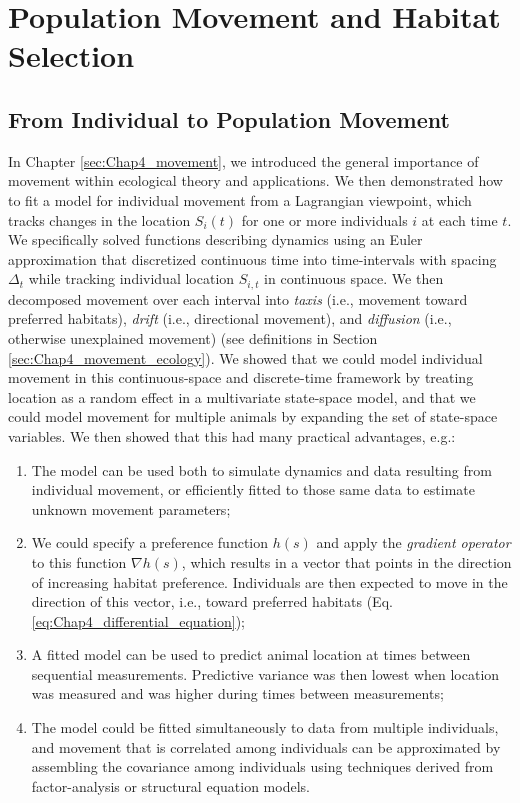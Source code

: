 \chapter{Population Movement and Habitat Selection}\label{Chap10_movement}

\section{From Individual to Population Movement} \label{sec:Chap10_Eulerian_movement}

In Chapter \ref{sec:Chap4_movement}, we introduced the general importance of movement within ecological theory and applications.  We then demonstrated how to fit a model for individual movement from a Lagrangian viewpoint, which tracks changes in the location \(S_{i}(t)\) for one or more individuals \(i\) at each time \(t\).  We specifically solved functions describing dynamics using an Euler approximation that discretized continuous time into time-intervals with spacing \(\Delta_t\) while tracking individual location \(S_{i,t}\) in continuous space.  We then decomposed movement over each interval into \textit{taxis} (i.e., movement toward preferred habitats), \textit{drift} (i.e., directional movement), and \textit{diffusion} (i.e., otherwise unexplained movement) (see definitions in Section \ref{sec:Chap4_movement_ecology}).  We showed that we could model individual movement in this continuous-space and discrete-time framework by treating location as a random effect in a multivariate state-space model, and that we could model movement for multiple animals by expanding the set of state-space variables.  We then showed that this had many practical advantages, e.g.:
\begin{enumerate}
    \item The model can be used both to simulate dynamics and data resulting from individual movement, or efficiently fitted to those same data to estimate unknown movement parameters;
    
    \item We could specify a preference function \(h(s)\) and apply the \textit{gradient operator} to this function \(\nabla h(s)\), which results in a vector that points in the direction of increasing habitat preference.  Individuals are then expected to move in the direction of this vector, i.e., toward preferred habitats (Eq. \ref{eq:Chap4_differential_equation});

    \item A fitted model can be used to predict animal location at times between sequential measurements.  Predictive variance was then lowest when location was measured and was higher during times between measurements;

    \item The model could be fitted simultaneously to data from multiple individuals, and movement that is correlated among individuals can be approximated by assembling the covariance among individuals using techniques derived from factor-analysis or structural equation models.
\end{enumerate}
